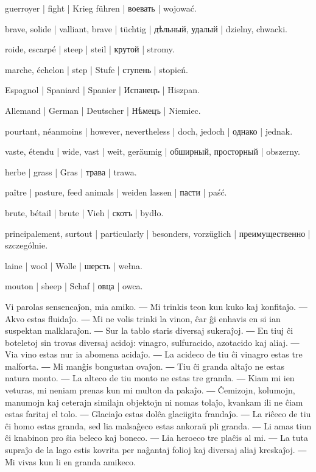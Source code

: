 \begin{ekzvocab}{1em}
 guerroyer | fight | Krieg führen | воевать | wojować.

 brave, solide | valliant, brave | tüchtig | дѣльный, удалый | dzielny, chwacki.

 roide, escarpé | steep | steil | крутой | stromy.

 marche, échelon | step | Stufe | ступень | stopień.

 Espagnol | Spaniard | Spanier | Испанецъ | Hiszpan.

 Allemand | German | Deutscher | Нѣмецъ | Niemiec.

 pourtant, néanmoins | however, nevertheless | doch, jedoch | однако | jednak.

 vaste, étendu | wide, vast | weit, geräumig | обширный, просторный | obszerny.

 herbe | grass | Gras | трава | trawa.

 paître | pasture, feed animals | weiden lassen | пасти | paść.

 brute, bétail | brute | Vieh | скотъ | bydło.

 principalement, surtout | particularly | besonders, vorzüglich | преимущественно | szczególnie.

 laine | wool | Wolle | шерсть | wełna.

 mouton | sheep | Schaf | овца | owca.

\end{ekzvocab}



Vi parolas sensencaĵon, mia amiko. ― Mi trinkis teon kun kuko kaj konfitaĵo. ― Akvo estas fluidaĵo. ― Mi ne volis trinki la vinon, ĉar ĝi enhavis en si ian suspektan malklaraĵon. ― Sur la tablo staris diversaj sukeraĵoj. ― En tiuj ĉi boteletoj sin trovas diversaj acidoj: vinagro, sulfuracido, azotacido kaj aliaj. ― Via vino estas nur ia abomena acidaĵo. ― La acideco de tiu ĉi vinagro estas tre malforta. ― Mi manĝis bongustan ovaĵon. ― Tiu ĉi granda altaĵo ne estas natura monto. ― La alteco de tiu monto ne estas tre granda. ― Kiam mi ien veturas, mi neniam prenas kun mi multon da pakaĵo. ― Ĉemizojn, kolumojn, manumojn kaj ceterajn similajn objektojn ni nomas tolaĵo, kvankam ili ne ĉiam estas faritaj el tolo. ― Glaciaĵo estas dolĉa glaciigita frandaĵo. ― La riĉeco de tiu ĉi homo estas granda, sed lia malsaĝeco estas ankoraŭ pli granda. ― Li amas tiun ĉi knabinon pro ŝia beleco kaj boneco. ― Lia heroeco tre plaĉis al mi. ― La tuta supraĵo de la lago estis kovrita per naĝantaj folioj kaj diversaj aliaj kreskaĵoj. ― Mi vivas kun li en granda amikeco.

